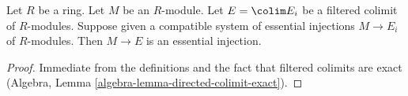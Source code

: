 \begin{lemma}
\label{lemma-union-essential-extensions}
Let $R$ be a ring. Let $M$ be an $R$-module. Let $E = \colim E_i$
be a filtered colimit of $R$-modules. Suppose given a compatible
system of essential injections $M \to E_i$ of $R$-modules.
Then $M \to E$ is an essential injection.
\end{lemma}

\begin{proof}
Immediate from the definitions and the fact that filtered
colimits are exact (Algebra, Lemma \ref{algebra-lemma-directed-colimit-exact}).
\end{proof}
